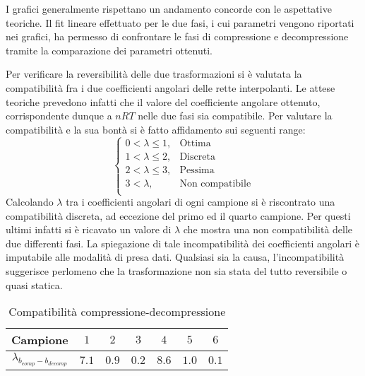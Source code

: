 \documentclass[a4paper,11pt,oneside]{article}
\begin{document}
I grafici generalmente rispettano un andamento concorde con le aspettative teoriche. Il fit lineare effettuato per le due fasi, i cui parametri vengono riportati nei grafici, ha permesso di confrontare le fasi di compressione e decompressione tramite la comparazione dei parametri ottenuti.

Per verificare la reversibilità delle due trasformazioni si è valutata la compatibilità fra i due coefficienti angolari delle rette interpolanti. Le attese teoriche prevedono infatti che il valore del coefficiente angolare ottenuto, corrispondente dunque a $n R T$ nelle due fasi sia compatibile. Per valutare la compatibilità e la sua bontà si è fatto affidamento sui seguenti range:
\begin{equation*}%
    \label{eq:cases}
    \begin{cases}
    0<\lambda\leq 1, & \text{Ottima}\\
    1<\lambda\leq2, & \text{Discreta}\\
    2<\lambda\leq3, & \text{Pessima}\\
    3<\lambda, & \text{Non compatibile}\\
    \end{cases}
\end{equation*}
Calcolando $\lambda$ tra i coefficienti angolari di ogni campione si è riscontrato una compatibilità discreta, ad eccezione del primo ed il quarto campione. Per questi ultimi infatti si è ricavato un valore di $\lambda$ che mostra una non compatibilità delle due differenti fasi. La spiegazione di tale incompatibilità dei coefficienti angolari  è imputabile alle modalità di presa dati. Qualsiasi sia la causa, l'incompatibilità suggerisce perlomeno che la trasformazione non sia stata del tutto reversibile o quasi statica. 

\begin{table}[h!]
\centering
\begin{tabular}{|c|c|c|c|c|c|c|}
    \hline
    \textbf{Campione} & $1$ & $2$ & $3$ & $4$ & $5$ & $6$ \\ \hline
    \rowcolor[rgb]{0.85,0.85,0.85}$\lambda_{b_{comp}-b_{decomp}}$ & $7.1$ & $0.9$ & $0.2$ & $8.6$ & $1.0$ & $0.1$ \\ \hline
    \end{tabular}
\caption{Compatibilità compressione-decompressione}
\label{tab:compatibilita_coeff_ang_compress_decompress}
\end{table}
\end{document}
